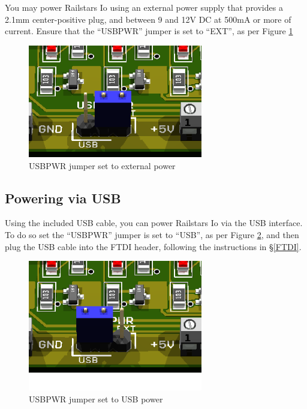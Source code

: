 \documentclass[12pt]{book}
\begin{document}
You may power Railstars Io using an external power supply that provides a 2.1mm center-positive plug, and between 9 and 12V DC at 500mA or more of current. Ensure that the ``USBPWR'' jumper is set to ``EXT'', as per Figure \ref{EXTPWR}

\begin{figure}[htbp]
\begin{center}
\includegraphics[width=3in]{images/IoUSBPowerEXT.png}
\caption{USBPWR jumper set to external power}
\label{EXTPWR}
\end{center}
\end{figure}

\subsection{Powering via USB}

Using the included USB cable, you can power Railstars Io via the USB interface. To do so set the ``USBPWR'' jumper is set to ``USB'', as per Figure \ref{USBPWR}, and then plug the USB cable into the FTDI header, following the instructions in \S\ref{FTDI}.

\begin{figure}[htbp]
\begin{center}
\includegraphics[width=3in]{images/IoUSBPowerUSB.png}
\caption{USBPWR jumper set to USB power}
\label{USBPWR}
\end{center}
\end{figure}
\end{document}

